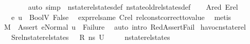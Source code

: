 \begin{isabellebody}
\ \ \ \ \ \ \isamarkupfalse%
\ {\isacharparenleft}{\kern0pt}auto\ simp{\isacharcolon}{\kern0pt}\ \ nstate{\isacharunderscore}{\kern0pt}rel{\isacharunderscore}{\kern0pt}states{\isacharunderscore}{\kern0pt}def\ nstate{\isacharunderscore}{\kern0pt}old{\isacharunderscore}{\kern0pt}rel{\isacharunderscore}{\kern0pt}states{\isacharunderscore}{\kern0pt}def{\isacharparenright}{\kern0pt}\isanewline
\ \ \isamarkupfalse%
\ Ared\ Erel\ \isamarkupfalse%
\ {\isachardoublequoteopen}{\isasymLambda}{\isacharprime}{\kern0pt}{\isacharcomma}{\kern0pt}{\isasymGamma}{\isacharcomma}{\kern0pt}{\isasymOmega}\ {\isasymturnstile}\ {\isasymlangle}e{}{\isacharcomma}{\kern0pt}\ u{\isasymrangle}\ {\isasymDown}\ {\isacharparenleft}{\kern0pt}BoolV\ False{\isacharparenright}{\kern0pt}{\isachardoublequoteclose}\ \isamarkupfalse%
\ expr{\isacharunderscore}{\kern0pt}rel{\isacharunderscore}{\kern0pt}same{\isacharparenleft}{\kern0pt}{}{\isacharparenright}{\kern0pt}\ Crel\ rel{\isacharunderscore}{\kern0pt}const{\isacharunderscore}{\kern0pt}correct{\isacharunderscore}{\kern0pt}to{\isacharunderscore}{\kern0pt}value\ \isamarkupfalse%
\ metis\isanewline
\ \ \isamarkupfalse%
\ {\isachardoublequoteopen}M{\isacharcomma}{\kern0pt}{\isasymLambda}{\isacharprime}{\kern0pt}{\isacharcomma}{\kern0pt}{\isasymGamma}{\isacharcomma}{\kern0pt}{\isasymOmega}\ {\isasymturnstile}\ {\isasymlangle}Assert\ e{}{\isacharcomma}{\kern0pt}Normal\ u{\isasymrangle}\ {\isasymrightarrow}\ Failure{\isachardoublequoteclose}\ \isamarkupfalse%
\ {\isacharparenleft}{\kern0pt}auto\ intro{\isacharcolon}{\kern0pt}\ RedAssertFail{\isacharparenright}{\kern0pt}\isanewline
{}\isamarkupfalse%
%
\endisatagproof
{\isafoldproof}%
%
\isadelimproof
\isanewline
%
\endisadelimproof
\isanewline
{}\isamarkupfalse%
\isanewline
\isanewline
\isanewline
{}\isamarkupfalse%
\ havoc{\isacharunderscore}{\kern0pt}nstate{\isacharunderscore}{\kern0pt}rel{\isacharcolon}{\kern0pt}\isanewline
\ \ \ Srel{\isacharcolon}{\kern0pt}{\isachardoublequoteopen}nstate{\isacharunderscore}{\kern0pt}rel{\isacharunderscore}{\kern0pt}states\ {\isasymLambda}\ {\isasymLambda}{\isacharprime}{\kern0pt}\ R\ ns\ U{\isachardoublequoteclose}\isanewline
\ \ \ \ \ {\isachardoublequoteopen}nstate{\isacharunderscore}{\kern0pt}rel{\isacharunderscore}{\kern0pt}states\ \isanewline

\end{isabellebody}
